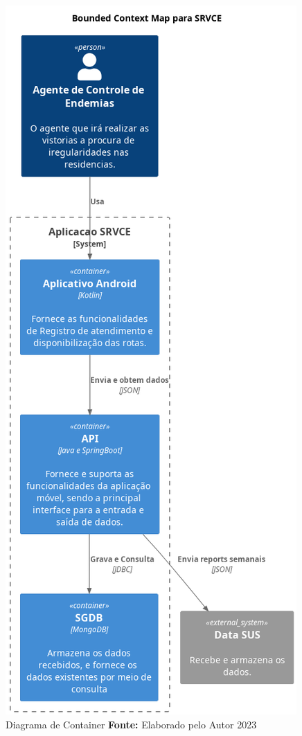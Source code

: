 \begin{figure}[!htb]
	\centering
	\includegraphics[height=0.5\textheight]{dados/figuras/bounded_context.png}
	\caption{Diagrama de Container \textbf{Fonte:} Elaborado pelo Autor 2023}
\end{figure}

